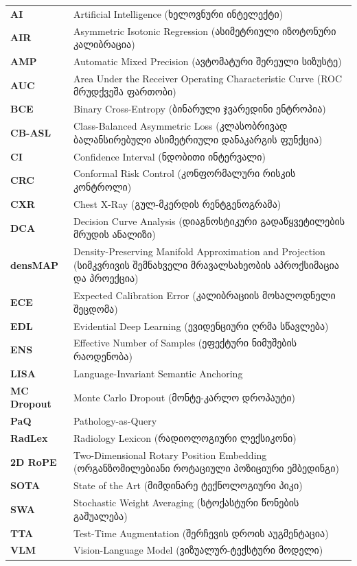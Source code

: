 \documentclass[12pt,a4paper,oneside]{report}
\begin{document}
\begin{center}
\begin{tabularx}{\textwidth}{l L}
\textbf{AI} & Artificial Intelligence (ხელოვნური ინტელექტი) \\
\textbf{AIR} & Asymmetric Isotonic Regression (ასიმეტრიული იზოტონური კალიბრაცია) \\
\textbf{AMP} & Automatic Mixed Precision (ავტომატური შერეული სიზუსტე) \\
\textbf{AUC} & Area Under the Receiver Operating Characteristic Curve (ROC მრუდქვეშა ფართობი) \\
\textbf{BCE} & Binary Cross-Entropy (ბინარული ჯვარედინი ენტროპია) \\
\textbf{CB-ASL} & Class-Balanced Asymmetric Loss (კლასობრივად ბალანსირებული ასიმეტრიული დანაკარგის ფუნქცია) \\
\textbf{CI} & Confidence Interval (ნდობითი ინტერვალი) \\
\textbf{CRC} & Conformal Risk Control (კონფორმალური რისკის კონტროლი) \\
\textbf{CXR} & Chest X-Ray (გულ-მკერდის რენტგენოგრამა) \\
\textbf{DCA} & Decision Curve Analysis (დიაგნოსტიკური გადაწყვეტილების მრუდის ანალიზი) \\
\textbf{densMAP} & Density-Preserving Manifold Approximation and Projection (სიმკვრივის შემნახველი მრავალსახეობის აპროქსიმაცია და პროექცია) \\
\textbf{ECE} & Expected Calibration Error (კალიბრაციის მოსალოდნელი შეცდომა) \\
\textbf{EDL} & Evidential Deep Learning (ევიდენციური ღრმა სწავლება) \\
\textbf{ENS} & Effective Number of Samples (ეფექტური ნიმუშების რაოდენობა) \\
\textbf{LISA} & Language-Invariant Semantic Anchoring \\
\textbf{MC Dropout} & Monte Carlo Dropout (მონტე-კარლო დროპაუტი) \\
\textbf{PaQ} & Pathology-as-Query \\
\textbf{RadLex} & Radiology Lexicon (რადიოლოგიური ლექსიკონი) \\
\textbf{2D RoPE} & Two-Dimensional Rotary Position Embedding (ორგანზომილებიანი როტაციული პოზიციური ემბედინგი) \\
\textbf{SOTA} & State of the Art (მიმდინარე ტექნოლოგიური პიკი) \\
\textbf{SWA} & Stochastic Weight Averaging (სტოქასტური წონების გაშუალება) \\
\textbf{TTA} & Test-Time Augmentation (შერჩევის დროის აუგმენტაცია) \\
\textbf{VLM} & Vision-Language Model (ვიზუალურ-ტექსტური მოდელი) \\
\end{tabularx}
\end{center}
\end{document}
